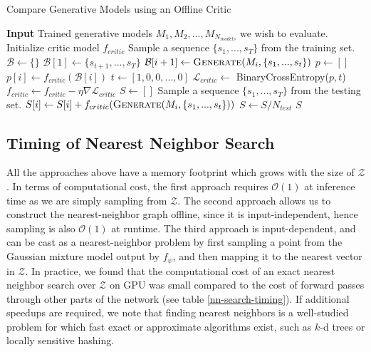 \documentclass{article}
\begin{document}
\begin{algorithm}[h]
  \caption{Compare Generative Models using an Offline Critic}\label{algo-critic}
  \begin{algorithmic}[1]
    \State \textbf{Input} Trained generative models $M_1, M_2, ..., M_{N_{models}}$ we wish to evaluate.
    \State Initialize critic model $f_{critic}$
    \State Sample a sequence $\{s_1, ..., s_T\}$ from the training set.
    \State $\mathcal{B} \gets \{\}$ 
    \State $\mathcal{B}[1] \gets \{s_{t+1}, ..., s_T\}$ 
    \State $\mathcal{B}[i+1] \gets \textsc{Generate}(M_i, \{s_1, ..., s_t\})$ 
    \EndFor
    \State $p \gets [ ]$
    \State $p[i] \gets f_{critic}(\mathcal{B}[i])$ 
    \EndFor
    \State $t \gets [1, 0, 0, ..., 0]$ 
    \State $\mathcal{L}_{critic} \gets $ BinaryCrossEntropy($p, t$)
    \State $f_{critic} \gets f_{critic} - \eta \nabla{\mathcal{L}_{critic}}$
    \EndFor
    \State $S\gets []$ 
    \State Sample a sequence $\{s_1, ..., s_T\}$ from the testing set.
     
    \State $S[i] \gets S[i] + f_{critic}(\textsc{Generate}(M_i, \{s_1, ..., s_t\}))$
    \EndFor
    \State $S \gets S / N_{test}$
    \EndFor
    \Return $S$ 
  \end{algorithmic}
\end{algorithm}



\subsection{Timing of Nearest Neighbor Search}
\label{computational-cost}


All the approaches above have a memory footprint which grows with the size of $\mathcal{Z}$.
In terms of computational cost, the first approach requires $\mathcal{O}(1)$ at inference time as we are simply sampling from $\mathcal{Z}$.
The second approach allows us to construct the nearest-neighbor graph offline, since it is input-independent, hence sampling is also $\mathcal{O}(1)$ at runtime.
The third approach is input-dependent, and can be cast as a nearest-neighbor problem by first sampling a point from the Gaussian mixture model output by $f_\psi$, and then mapping it to the nearest vector in $\mathcal{Z}$.
In practice, we found that the computational cost of an exact nearest neighbor search over $\mathcal{Z}$ on GPU was small compared to the cost of forward passes through other parts of the network (see table \ref{nn-search-timing}).
If additional speedups are required, we note that finding nearest neighbors is a well-studied problem for which fast exact or approximate algorithms exist, such as $k$-d trees or locally sensitive hashing.
\end{document}
